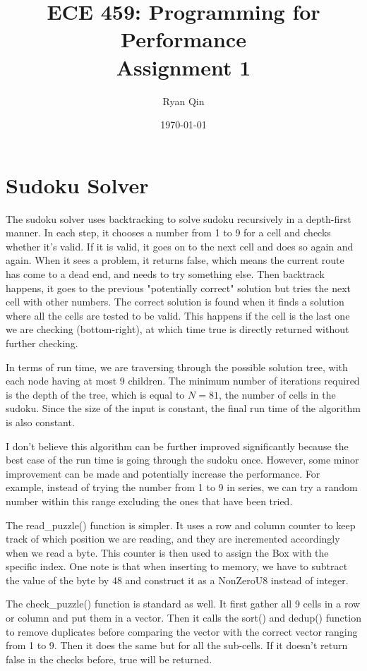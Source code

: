 \documentclass[12pt]{article}
\title{ECE 459: Programming for Performance\\Assignment 1}
\author{Ryan Qin}
\date{\today}
\begin{document}
\maketitle

\section{Sudoku Solver}
    The sudoku solver uses backtracking to solve sudoku recursively in a depth-first manner.
    In each step, it chooses a number from 1 to 9 for a cell and checks whether it's valid.
    If it is valid, it goes on to the next cell and does so again and again.
    When it sees a problem, it returns false, which means the current route has come to a dead end, and needs to try something else.
    Then backtrack happens, it goes to the previous "potentially correct" solution but tries the next cell with other numbers.
    The correct solution is found when it finds a solution where all the cells are tested to be valid.
    This happens if the cell is the last one we are checking (bottom-right), at which time true is directly returned without further checking.

    In terms of run time, we are traversing through the possible solution tree, with each node having at most 9 children.
    The minimum number of iterations required is the depth of the tree, which is equal to \(N=81\), the number of cells in the sudoku.
    Since the size of the input is constant, the final run time of the algorithm is also constant.

    I don't believe this algorithm can be further improved significantly because the best case of the run time is going through the sudoku once.
    However, some minor improvement can be made and potentially increase the performance.
    For example, instead of trying the number from 1 to 9 in series, we can try a random number within this range excluding the ones that have been tried.

    The read\_puzzle() function is simpler.
    It uses a row and column counter to keep track of which position we are reading, and they are incremented accordingly when we read a byte.
    This counter is then used to assign the Box with the specific index.
    One note is that when inserting to memory, we have to subtract the value of the byte by 48 and construct it as a NonZeroU8 instead of integer.

    The check\_puzzle() function is standard as well.
    It first gather all 9 cells in a row or column and put them in a vector.
    Then it calls the sort() and dedup() function to remove duplicates before comparing the vector with the correct vector ranging from 1 to 9.
    Then it does the same but for all the sub-cells.
    If it doesn't return false in the checks before, true will be returned.
\end{document}
